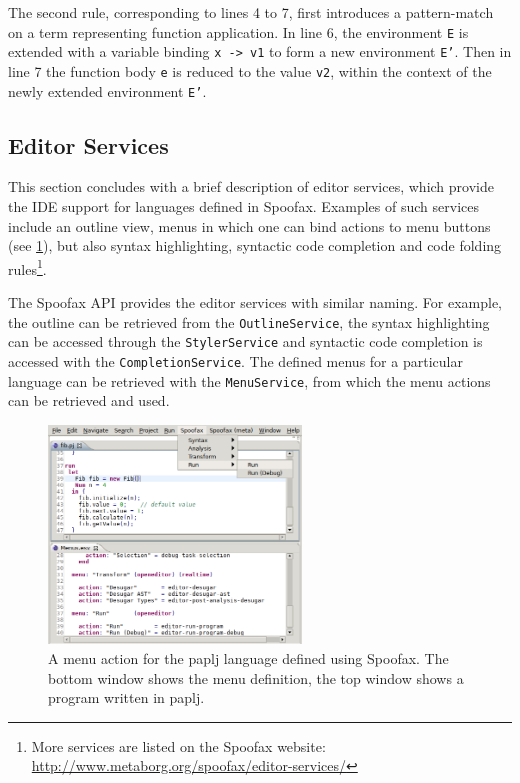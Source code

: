The second rule, corresponding to lines 4 to 7, first introduces a pattern-match
on a term representing function application. In line 6, the environment
\texttt{E} is extended with a variable binding \texttt{x -> v1} to form a new
environment \texttt{E'}. Then in line 7 the function body \texttt{e} is reduced
to the value \texttt{v2}, within the context of the newly extended environment
\texttt{E'}.

\subsection{Editor Services}
\label{ssec:editor-serv}
This section concludes with a brief description of editor services,
which provide the IDE support for languages defined in
Spoofax. Examples of such services include an outline view, menus in
which one can bind actions to menu buttons (see
\cref{fig:menu-actions}), but also syntax highlighting, syntactic code
completion and code folding rules\footnote{More services are
listed on the Spoofax website:
\url{http://www.metaborg.org/spoofax/editor-services/}}.

The Spoofax API provides the editor services with similar naming. For
example, the outline can be retrieved from the \texttt{OutlineService}, the
syntax highlighting can be accessed through the \texttt{StylerService} and
syntactic code completion is accessed with the
\texttt{CompletionService}. The defined menus for a particular language can
be retrieved with the \texttt{MenuService}, from which the menu actions can
be retrieved and used.

\begin{figure}[bt]
\centering
\includegraphics[width=0.6\textwidth]{./img/menu-actions.png}
\caption{\label{fig:menu-actions}
A menu action for the paplj language defined using Spoofax. The bottom window shows the menu definition, the top window shows a program written in paplj.}
\end{figure}

